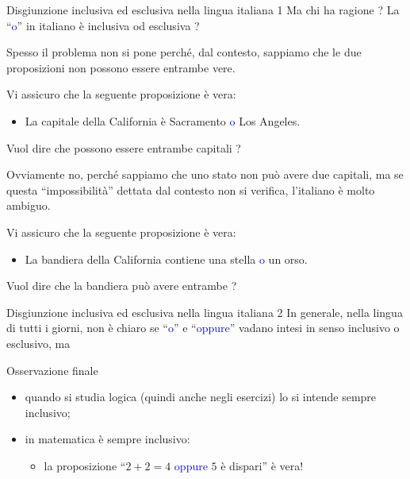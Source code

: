 \documentclass[aspectratio=169,10pt]{beamer}
\newcommand{\conn}[1]{\textcolor{blue}{#1}}
\begin{document}
\begin{frame}{Disgiunzione inclusiva ed esclusiva nella lingua italiana 1}
    Ma chi ha ragione ? La ``\conn{o}'' in italiano è inclusiva od esclusiva ?
    \medskip

    Spesso il problema non si pone perché, dal contesto, sappiamo che le due proposizioni non possono essere entrambe vere.
    \pause

    \begin{example}
        Vi assicuro che la seguente proposizione è vera:
        \begin{itemize}
        \item La capitale della California è Sacramento \conn{o} Los Angeles.
        \end{itemize}
        Vuol dire che possono essere entrambe capitali ?
    \end{example}
    \pause
         Ovviamente no, perché sappiamo che uno stato non può avere due capitali, ma se questa  ``impossibilità'' dettata dal contesto non si verifica, l'italiano è molto ambiguo.
    \begin{example}
        Vi assicuro che la seguente proposizione è vera:
        \begin{itemize}
        \item La bandiera della California contiene una stella \conn{o} un orso.
        \end{itemize}
        Vuol dire che la bandiera può avere entrambe ?
    \end{example}
\end{frame}

\begin{frame}{Disgiunzione inclusiva ed esclusiva nella lingua italiana 2}
    In generale, nella lingua di tutti i giorni, non è chiaro se ``\conn{o}''  e ``\conn{oppure}'' vadano intesi in senso inclusivo o esclusivo, ma
    \begin{block}{Osservazione finale}
    \begin{itemize}
        \item quando si studia logica (quindi anche negli esercizi) lo si intende sempre inclusivo;
        \item in matematica è sempre inclusivo:
        \begin{itemize}
        \item la proposizione ``$2 + 2 = 4$ \conn{oppure} $5$ è dispari'' è vera!
        \end{itemize}
    \end{itemize}
    \end{block}
\end{frame}
\end{document}
